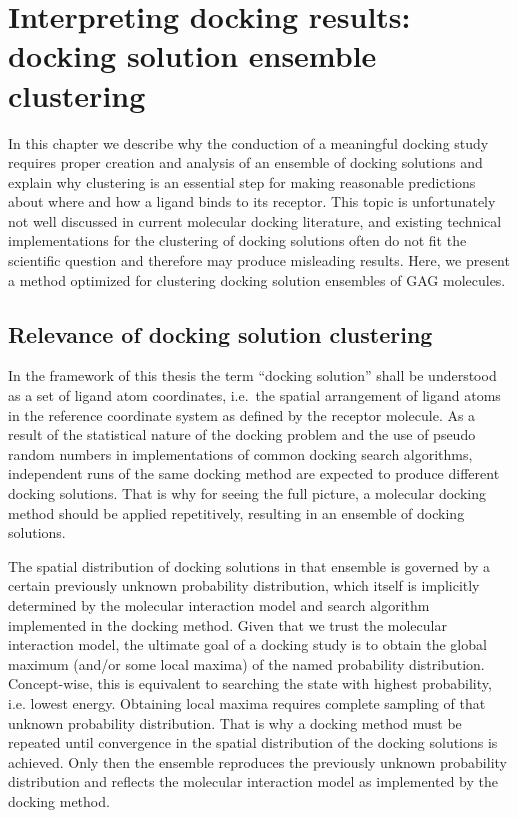 \chapter{Interpreting docking results: docking solution ensemble clustering}

In this chapter we describe why the conduction of a meaningful docking study
requires proper creation and analysis of an ensemble of docking solutions and
explain why clustering is an essential step for making reasonable predictions
about where and how a ligand binds to its receptor. This topic is unfortunately
not well discussed in current molecular docking literature, and existing
technical implementations for the clustering of docking solutions often do not
fit the scientific question and therefore may produce misleading results. Here,
we present a method optimized for clustering docking solution ensembles of GAG
molecules.

\section{Relevance of docking solution clustering}
\label{relevance_of_clustering}

In the framework of this thesis the term \enquote{docking solution} shall be
understood as a set of ligand atom coordinates, i.e.\ the spatial arrangement of
ligand atoms in the reference coordinate system as defined by the receptor
molecule. As a result of the statistical nature of the docking problem and the
use of pseudo random numbers in implementations of common docking search
algorithms, independent runs of the same docking method are expected to produce
different docking solutions. That is why for seeing the full picture, a
molecular docking method should be applied repetitively, resulting in an
ensemble of docking solutions.

The spatial distribution of docking solutions in that ensemble is governed by a
certain previously unknown probability distribution, which itself is implicitly
determined by the molecular interaction model and search algorithm implemented
in the docking method. Given that we trust the molecular interaction model, the
ultimate goal of a docking study is to obtain the global maximum (and/or some
local maxima) of the named probability distribution. Concept-wise, this is
equivalent to searching the state with highest probability, i.e. lowest energy.
Obtaining local maxima requires complete sampling of that unknown probability
distribution. That is why a docking method must be repeated until convergence
in the spatial distribution of the docking solutions is achieved. Only then the
ensemble reproduces the previously unknown probability distribution and reflects
the molecular interaction model as implemented by the docking method.


